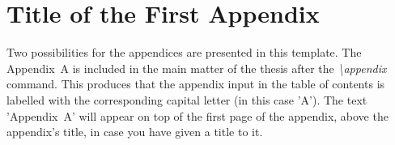 \chapter{Title of the First Appendix}

Two possibilities for the appendices are presented in this template. The Appendix~A is included in the main matter of the thesis after the \textit{\textbackslash\hspace{-0.5mm}appendix} command. This produces that the appendix input in the table of contents is labelled with the corresponding capital letter (in this case 'A'). The text 'Appendix~A' will appear on top of the first page of the appendix, above the appendix's title, in case you have given a title to it. 




